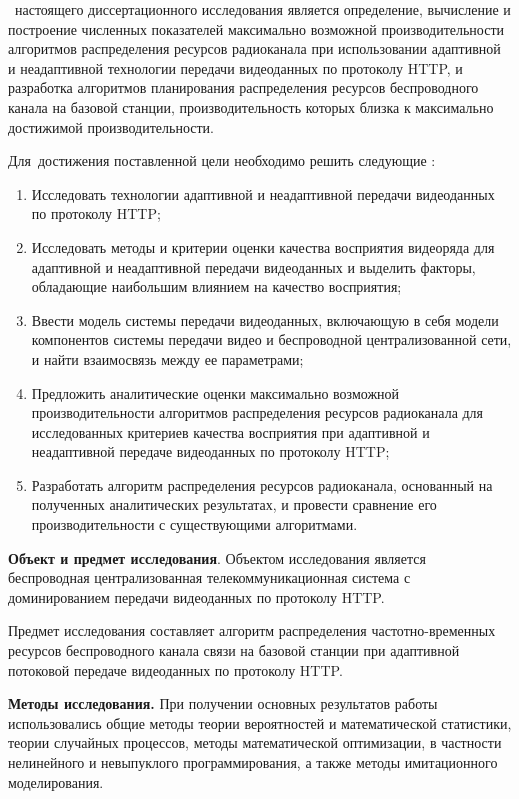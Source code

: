 \aim\ настоящего диссертационного исследования является определение, вычисление и построение численных показателей максимально возможной производительности алгоритмов распределения ресурсов радиоканала при использовании адаптивной и неадаптивной технологии передачи видеоданных по протоколу HTTP, и разработка алгоритмов планирования распределения ресурсов беспроводного канала на базовой станции, производительность которых близка к максимально достижимой производительности.

Для~достижения поставленной цели необходимо решить следующие {\tasks}:
\begin{enumerate}
    \item Исследовать технологии адаптивной и неадаптивной передачи видеоданных по протоколу HTTP;
    \item Исследовать методы и критерии оценки качества восприятия видеоряда для адаптивной и неадаптивной передачи видеоданных и выделить факторы, обладающие наибольшим влиянием на качество восприятия;
    \item Ввести модель системы передачи видеоданных, включающую в себя модели компонентов системы передачи видео и беспроводной централизованной сети, и найти взаимосвязь между ее параметрами;
    \item Предложить аналитические оценки максимально возможной производительности алгоритмов распределения ресурсов радиоканала для исследованных критериев качества восприятия при адаптивной и неадаптивной передаче видеоданных по протоколу HTTP;
    \item Разработать алгоритм распределения ресурсов радиоканала, основанный на полученных аналитических результатах, и провести сравнение его производительности с существующими алгоритмами.
\end{enumerate}

\textbf{Объект и предмет исследования}. Объектом исследования является беспроводная централизованная телекоммуникационная система с доминированием передачи видеоданных по протоколу HTTP.

Предмет исследования составляет алгоритм распределения частотно-временных ресурсов беспроводного канала связи на базовой станции при адаптивной потоковой передаче видеоданных по протоколу HTTP.

\textbf{Методы исследования.} При получении основных результатов работы использовались общие методы теории вероятностей и математической статистики, теории случайных процессов, методы математической оптимизации, в частности нелинейного и невыпуклого программирования, а также методы имитационного моделирования.

